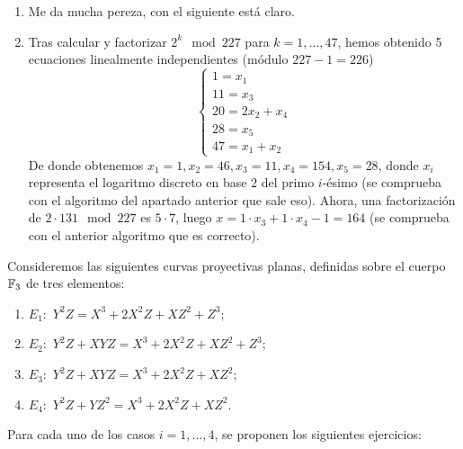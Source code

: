 \documentclass[twoside]{article}
\begin{document}
\begin{solucion}

 \begin{enumerate}
 \item Me da mucha pereza, con el siguiente está claro.

 
 
 \item Tras calcular y factorizar $2^k\mod 227$ para $k=1,\dots, 47$, hemos obtenido 5 ecuaciones linealmente independientes (módulo $227-1=226$)
 \[
 \begin{cases}
 1=x_1\\
 11=x_3\\
 20=2x_2+x_4\\
 28=x_5\\
 47=x_1+x_2
 \end{cases}
 \]
 De donde obtenemos $x_1=1,x_2=46,x_3=11,x_4=154,x_5=28$, donde $x_i$ representa el logaritmo discreto en base $2$ del primo $i$-ésimo (se comprueba con el algoritmo del apartado anterior que sale eso). Ahora, una factorización de $2\cdot 131\mod 227$ es $5\cdot 7$, luego $x=1\cdot x_3+1\cdot x_4-1=164$ (se comprueba con el anterior algoritmo que es correcto).
 

 \end{enumerate}
\end{solucion}
\newpage 

Consideremos las siguientes curvas proyectivas planas, definidas sobre el cuerpo $\mathbb{F}_3$ de
tres elementos:
\begin{enumerate}[1)]
\item $E_1 :$ $Y^2Z = X^3 + 2X^2Z + XZ^2 + Z^3$;
\item $E_2 :$ $Y^2Z + XYZ = X^3 + 2X^2Z + XZ^2 + Z^3$;
\item $E_3 :$ $Y^2Z + XYZ = X^3 + 2X^2Z + XZ^2$;
\item $E_4 :$ $Y^2Z + YZ^2 = X^3 + 2X^2Z + XZ^2$.
\end{enumerate}
Para cada uno de los casos $i = 1, \dots , 4$, se proponen los siguientes ejercicios:
\end{document}
